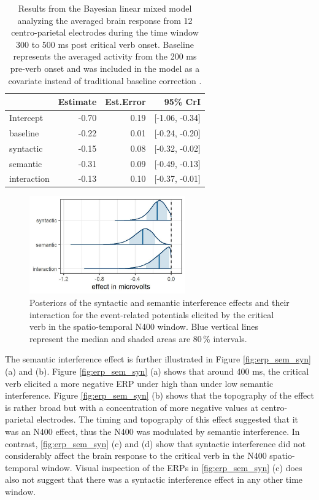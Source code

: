 \documentclass[a4paper, man, floatsintext]{apa7}
\begin{document}
\begin{table}[H]
    \caption{Results from the Bayesian linear mixed model analyzing the averaged brain response from 12 centro-parietal electrodes during the time window 300 to 500 ms post critical verb onset. Baseline represents the averaged activity from the 200 ms pre-verb onset and was included in the model as a covariate instead of traditional baseline correction \citep[see][]{alday2019}.}
    \label{tab:eeg_mod}
    \centering
    \begin{tabular}{lrrr}
    \toprule
    & Estimate & Est.Error & 95\% CrI  \\
    \midrule
Intercept &  -0.70 & 0.19 &  [-1.06, -0.34] \\
baseline  &  -0.22 & 0.01 &  [-0.24, -0.20] \\
syntactic &  -0.15 & 0.08 &  [-0.32, -0.02] \\
semantic  &  -0.31 & 0.09 &  [-0.49, -0.13] \\
interaction& -0.13 & 0.10 &  [-0.37, -0.01] \\
    \bottomrule
    \end{tabular}
\end{table}

\begin{figure}[H]
    \caption{Posteriors of the syntactic and semantic interference effects and their interaction for the event-related potentials elicited by the critical verb in the spatio-temporal N400 window. Blue vertical lines represent the median and shaded areas are 80\,\% intervals.}
    \label{fig:eeg_posteriors}
    \centering
    \includegraphics[width=0.6\textwidth]{images/posteriors_eeg.jpg}
\end{figure}


The semantic interference effect is further illustrated in Figure \ref{fig:erp_sem_syn} (a) and (b). Figure \ref{fig:erp_sem_syn} (a) shows that around 400 ms, the critical verb elicited a more negative ERP under high than under low semantic interference. Figure \ref{fig:erp_sem_syn} (b) shows that the topography of the effect is rather broad but with a concentration of more negative values at centro-parietal electrodes. The timing and topography of this effect suggested that it was an N400 effect, thus the N400 was modulated by semantic interference. In contrast, \ref{fig:erp_sem_syn} (c) and (d) show that syntactic interference did not considerably affect the brain response to the critical verb in the N400 spatio-temporal window. Visual inspection of the ERPs in \ref{fig:erp_sem_syn} (c) does also not suggest that there was a syntactic interference effect in any other time window.
\end{document}
